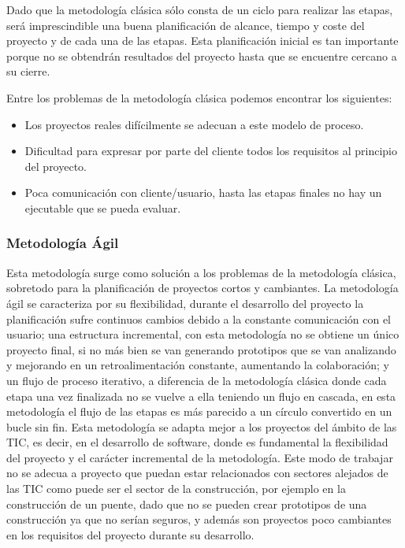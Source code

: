 Dado que la metodología clásica sólo consta de un ciclo para realizar las etapas, será imprescindible una buena planificación de alcance, tiempo y coste del proyecto y de cada una de las etapas. Esta planificación inicial es tan importante porque no se obtendrán resultados del proyecto hasta que se encuentre cercano a su cierre.

Entre los problemas de la metodología clásica podemos encontrar los siguientes:

\begin{itemize}
    \item Los proyectos reales difícilmente se adecuan a este modelo de proceso.
    \item Dificultad para expresar por parte del cliente todos los requisitos al principio del proyecto.
    \item Poca comunicación con cliente/usuario, hasta las etapas finales no hay un ejecutable que se pueda evaluar.
\end{itemize}


\subsubsection{Metodología Ágil}

Esta metodología surge como solución a los problemas de la metodología clásica, sobretodo para la planificación de proyectos cortos y cambiantes. La metodología ágil se caracteriza por su flexibilidad, durante el desarrollo del proyecto la planificación sufre continuos cambios debido a la constante comunicación con el usuario; una estructura incremental, con esta metodología no se obtiene un único proyecto final, si no más bien se van generando prototipos que se van analizando y mejorando en un retroalimentación constante, aumentando la colaboración; y un flujo de proceso iterativo, a diferencia de la metodología clásica donde cada etapa una vez finalizada no se vuelve a ella teniendo un flujo en cascada, en esta metodología el flujo de las etapas es más parecido a un círculo convertido en un bucle sin fin. Esta metodología se adapta mejor a los proyectos del ámbito de las TIC, es decir, en el desarrollo de software, donde es fundamental la flexibilidad del proyecto y el carácter incremental de la metodología. Este modo de trabajar no se adecua a proyecto que puedan estar relacionados con sectores alejados de las TIC como puede ser el sector de la construcción, por ejemplo en la construcción de un puente, dado que no se pueden crear prototipos de una construcción ya que no serían seguros, y además son proyectos poco cambiantes en los requisitos del proyecto durante su desarrollo.

